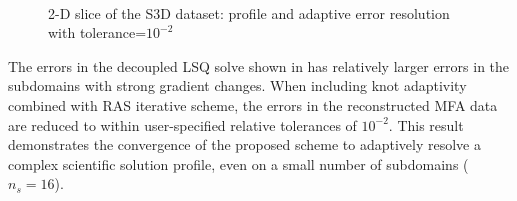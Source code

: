 \begin{figure}
	\centering
	\hfill
	\\
	\caption{2-D slice of the S3D dataset: profile and adaptive error resolution with tolerance=$10^{-2}$}
	\label{fig:s3d-adaptive-2d}
\end{figure}

The errors in the decoupled LSQ solve shown in  has relatively larger errors in the subdomains with strong gradient changes. When including knot adaptivity combined with RAS iterative scheme, the errors in the reconstructed MFA data are reduced to within user-specified relative tolerances of $10^{-2}$. This result demonstrates the convergence of the proposed scheme to adaptively resolve a complex scientific solution profile, even on a small number of subdomains ($n_s=16$). 

